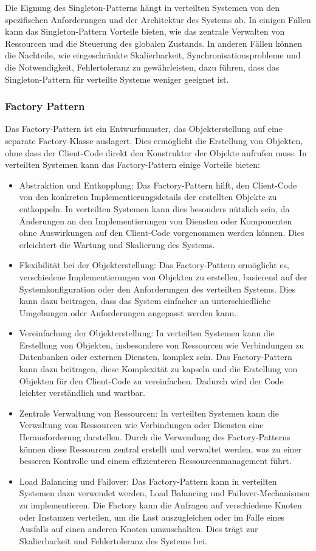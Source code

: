 Die Eignung des Singleton-Patterns hängt in verteilten Systemen von den spezifischen Anforderungen und der Architektur des Systems ab. In einigen Fällen kann das Singleton-Pattern Vorteile bieten, wie das zentrale Verwalten von Ressourcen und die Steuerung des globalen Zustands. In anderen Fällen können die Nachteile, wie eingeschränkte Skalierbarkeit, Synchronisationsprobleme und die Notwendigkeit, Fehlertoleranz zu gewährleisten, dazu führen, dass das Singleton-Pattern für verteilte Systeme weniger geeignet ist.

\subsubsection{Factory Pattern}
Das Factory-Pattern ist ein Entwurfsmuster, das Objekterstellung auf eine separate Factory-Klasse auslagert. Dies ermöglicht die Erstellung von Objekten, ohne dass der Client-Code direkt den Konstruktor der Objekte aufrufen muss. In verteilten Systemen kann das Factory-Pattern einige Vorteile bieten:
\begin{itemize}
\item Abstraktion und Entkopplung: Das Factory-Pattern hilft, den Client-Code von den konkreten Implementierungsdetails der erstellten Objekte zu entkoppeln. In verteilten Systemen kann dies besonders nützlich sein, da Änderungen an den Implementierungen von Diensten oder Komponenten ohne Auswirkungen auf den Client-Code vorgenommen werden können. Dies erleichtert die Wartung und Skalierung des Systems.
\item Flexibilität bei der Objekterstellung: Das Factory-Pattern ermöglicht es, verschiedene Implementierungen von Objekten zu erstellen, basierend auf der Systemkonfiguration oder den Anforderungen des verteilten Systems. Dies kann dazu beitragen, dass das System einfacher an unterschiedliche Umgebungen oder Anforderungen angepasst werden kann.
\item Vereinfachung der Objekterstellung: In verteilten Systemen kann die Erstellung von Objekten, insbesondere von Ressourcen wie Verbindungen zu Datenbanken oder externen Diensten, komplex sein. Das Factory-Pattern kann dazu beitragen, diese Komplexität zu kapseln und die Erstellung von Objekten für den Client-Code zu vereinfachen. Dadurch wird der Code leichter verständlich und wartbar.
\item Zentrale Verwaltung von Ressourcen: In verteilten Systemen kann die Verwaltung von Ressourcen wie Verbindungen oder Diensten eine Herausforderung darstellen. Durch die Verwendung des Factory-Patterns können diese Ressourcen zentral erstellt und verwaltet werden, was zu einer besseren Kontrolle und einem effizienteren Ressourcenmanagement führt.
\item Load Balancing und Failover: Das Factory-Pattern kann in verteilten Systemen dazu verwendet werden, Load Balancing und Failover-Mechanismen zu implementieren. Die Factory kann die Anfragen auf verschiedene Knoten oder Instanzen verteilen, um die Last auszugleichen oder im Falle eines Ausfalls auf einen anderen Knoten umzuschalten. Dies trägt zur Skalierbarkeit und Fehlertoleranz des Systems bei.
\end{itemize}
